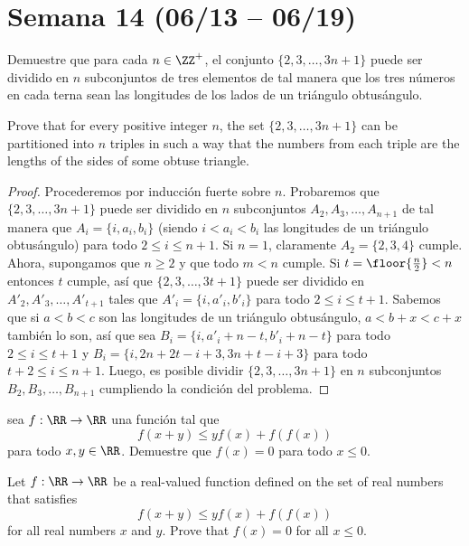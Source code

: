 \section{Semana 14 (06/13 -- 06/19)}


\begin{probHR}[ISL 2011/A5]
	Demuestre que para cada $n\in\ZZ^+$, el conjunto $\{2,3,\dots,3n+1\}$ puede ser dividido en $n$ subconjuntos de tres elementos de tal manera que los tres números en cada terna sean las longitudes de los lados de un triángulo obtusángulo.
	\begin{hint}
		Prove that for every positive integer $n$, the set $\{2,3,\dots,3n+1\}$ can be partitioned into $n$ triples in such a way that the numbers from each triple are the lengths of the sides of some obtuse triangle.
	\end{hint}
\end{probHR}

\begin{proof}
	Procederemos por inducción fuerte sobre $n$. Probaremos que $\{2,3,\dots,3n+1\}$ puede ser dividido en $n$ subconjuntos $A_2,A_3,\dots,A_{n+1}$ de tal manera que $A_i=\{i,a_i,b_i\}$ (siendo $i<a_i<b_i$ las longitudes de un triángulo obtusángulo) para todo $2\le i\le n+1$. Si $n=1$, claramente $A_2=\{2,3,4\}$ cumple. Ahora, supongamos que $n\ge 2$ y que todo $m<n$ cumple. Si $t=\floor{\frac n2}<n$ entonces $t$ cumple, así que $\{2,3,\dots,3t+1\}$ puede ser dividido en $A'_2,A'_3,\dots,A'_{t+1}$ tales que $A'_i=\{i,a'_i,b'_i\}$ para todo $2\le i\le t+1$. Sabemos que si $a<b<c$ son las longitudes de un triángulo obtusángulo, $a<b+x<c+x$ también lo son, así que sea $B_i=\{i,a'_i+n-t,b'_i+n-t\}$ para todo $2\le i\le t+1$ y $B_i=\{i,2n+2t-i+3,3n+t-i+3\}$ para todo $t+2\le i\le n+1$. Luego, es posible dividir $\{2,3,\dots,3n+1\}$ en $n$ subconjuntos $B_2,B_3,\dots,B_{n+1}$ cumpliendo la condición del problema.
\end{proof}


\begin{probEG}[ISL 2011/A6]
	sea $f:\RR\to\RR$ una función tal que
	\[f(x+y)\le yf(x)+f(f(x))\]
	para todo $x,y\in\RR$. Demuestre que $f(x)=0$ para todo $x\le 0$.
	\begin{hint}
		Let $f:\RR\to\RR$ be a real-valued function defined on the set of real numbers that satisfies
		\[f(x+y)\le yf(x)+f(f(x))\]
		for all real numbers $x$ and $y$. Prove that $f(x)=0$ for all $x\le 0$.
	\end{hint}
\end{probEG}

